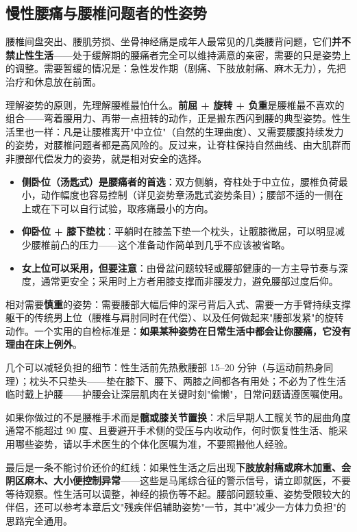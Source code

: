 \subsection{慢性腰痛与腰椎问题者的性姿势}

腰椎间盘突出、腰肌劳损、坐骨神经痛是成年人最常见的几类腰背问题，它们\textbf{并不禁止性生活}——处于缓解期的腰痛者完全可以维持满意的亲密，需要的只是姿势上的调整。需要暂缓的情况是：急性发作期（剧痛、下肢放射痛、麻木无力），先把治疗和休息放在前面。

理解姿势的原则，先理解腰椎最怕什么。\textbf{前屈 + 旋转 + 负重}是腰椎最不喜欢的组合——弯着腰用力、再带一点扭转的动作，正是搬东西闪到腰的典型姿势。性生活里也一样：凡是让腰椎离开"中立位"（自然的生理曲度）、又需要腰腹持续发力的姿势，对腰椎问题者都是高风险的。反过来，让脊柱保持自然曲线、由大肌群而非腰部代偿发力的姿势，就是相对安全的选择。

\begin{itemize}
	\item \textbf{侧卧位（汤匙式）是腰痛者的首选}：双方侧躺，脊柱处于中立位，腰椎负荷最小，动作幅度也容易控制（详见姿势章汤匙式姿势条目）；腰部不适的一侧在上或在下可以自行试验，取疼痛最小的方向。
	\item \textbf{仰卧位 + 膝下垫枕}：平躺时在膝盖下垫一个枕头，让髋膝微屈，可以明显减少腰椎前凸的压力——这个准备动作简单到几乎不应该被省略。
	\item \textbf{女上位可以采用，但要注意}：由骨盆问题较轻或腰部健康的一方主导节奏与深度，通常更安全；采用时上方者用膝支撑而非腰发力，避免腰部过度后仰。
\end{itemize}

相对需要\textbf{慎重}的姿势：需要腰部大幅后伸的深弓背后入式、需要一方手臂持续支撑躯干的传统男上位（腰椎与肩肘同时在代偿）、以及任何做起来"腰部发紧"的旋转动作。一个实用的自检标准是：\textbf{如果某种姿势在日常生活中都会让你腰痛，它没有理由在床上例外}。

几个可以减轻负担的细节：性生活前先热敷腰部 15--20 分钟（与运动前热身同理）；枕头不只垫头——垫在膝下、腰下、两膝之间都各有用处；不必为了性生活临时戴上护腰——护腰会让深层肌肉在关键时刻"偷懒"，日常问题请遵医嘱使用。

如果你做过的不是腰椎手术而是\textbf{髋或膝关节置换}：术后早期人工髋关节的屈曲角度通常不能超过 90 度、且要避开手术侧的受压与内收动作，何时恢复性生活、能采用哪些姿势，请以手术医生的个体化医嘱为准，不要照搬他人经验。

最后是一条不能讨价还价的红线：如果性生活之后出现\textbf{下肢放射痛或麻木加重、会阴区麻木、大小便控制异常}——这些是马尾综合征的警示信号，请立即就医，不要等待观察。性生活可以调整，神经的损伤等不起。腰部问题较重、姿势受限较大的伴侣，还可以参考本章后文"残疾伴侣辅助姿势"一节，其中"减少一方体力负担"的思路完全通用。
